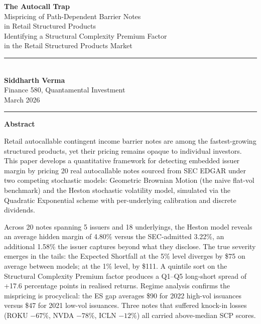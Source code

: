 \documentclass[12pt,a4paper]{article}
\begin{document}
\begin{titlepage}
\centering
\vspace*{2cm}
{\Huge\bfseries The Autocall Trap}\\[0.8cm]
{\LARGE Mispricing of Path-Dependent Barrier Notes\\in Retail Structured Products}\\[1.5cm]
{\large Identifying a Structural Complexity Premium Factor\\in the Retail Structured Products Market}\\[2.5cm]
\rule{0.6\textwidth}{0.4pt}\\[1cm]
{\Large\bfseries Siddharth Verma}\\[0.5cm]
{\large Finance 580, Quantamental Investment}\\[0.5cm]
{\large March 2026}\\[1.5cm]
\rule{0.6\textwidth}{0.4pt}
\vfill
\end{titlepage}

\newpage
\begin{center}
{\Large\bfseries Abstract}
\end{center}
\vspace{0.5cm}

\noindent
Retail autocallable contingent income barrier notes are among the fastest-growing structured products, yet their pricing remains opaque to individual investors. This paper develops a quantitative framework for detecting embedded issuer margin by pricing 20 real autocallable notes sourced from SEC EDGAR under two competing stochastic models: Geometric Brownian Motion (the naive flat-vol benchmark) and the Heston stochastic volatility model, simulated via the Quadratic Exponential scheme with per-underlying calibration and discrete dividends.

Across 20 notes spanning 5 issuers and 18 underlyings, the Heston model reveals an average hidden margin of 4.80\% versus the SEC-admitted 3.22\%, an additional 1.58\% the issuer captures beyond what they disclose. The true severity emerges in the tails: the Expected Shortfall at the 5\% level diverges by \$75 on average between models; at the 1\% level, by \$111. A quintile sort on the Structural Complexity Premium factor produces a Q1--Q5 long-short spread of +17.6 percentage points in realised returns. Regime analysis confirms the mispricing is procyclical: the ES gap averages \$90 for 2022 high-vol issuances versus \$47 for 2021 low-vol issuances. Three notes that suffered knock-in losses (ROKU $-67\%$, NVDA $-78\%$, ICLN $-12\%$) all carried above-median SCP scores.
\end{document}
